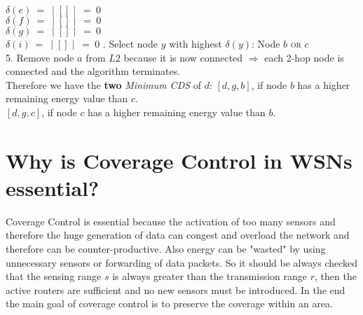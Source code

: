 \documentclass{report}
\begin{document}
			$\delta (e) \ = \ \mid [] \mid \ = \ 0$ \\
			$\delta (f) \ = \ \mid [] \mid \ = \ 0$ \\
			$\delta (g) \ = \ \mid [] \mid \ = \ 0$ \\
			$\delta (i) \ = \ \mid [] \mid \ = \ 0$
		. Select node $y$ with highest $\delta(y)$: Node $b$ \textsc{or} $c$ \\
		5. Remove node $a$ from $L2$ because it is now connected $\Rightarrow$ each 2-hop node is connected and the algorithm terminates. \\
		Therefore we have the \textbf{two} \textit{Minimum CDS} of $d$:
		\startsection
			$[d,g,b]$, if node $b$ has a higher remaining energy value than $c$. \\
			$[d,g,c]$, if node $c$ has a higher remaining energy value than $b$.
		\closesection
	\closesection
	
	\section{Why is Coverage Control in WSNs essential?}
	\startsection
		Coverage Control is essential because the activation of too many sensors and therefore the huge generation of data can congest and overload the network and therefore can be counter-productive. Also energy can be "wasted" by using unnecessary sensors or forwarding of data packets. So it should be always checked that the sensing range $s$ is always greater than the transmission range $r$, then the active routers are sufficient and no new sensors must be introduced. In the end the main goal of coverage control is to preserve the coverage within an area.
	\closesection
\end{document}
